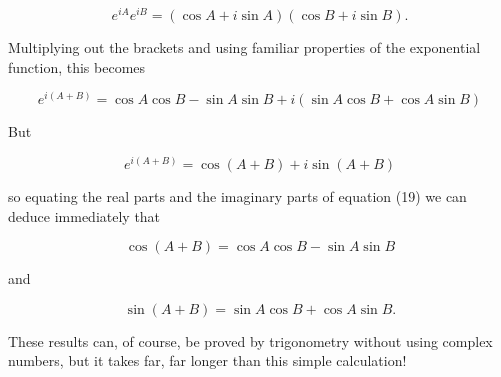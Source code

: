   $$e^{iA} e^{iB} = (\cos A +i \sin A)(\cos B +i \sin B). \tag{18}$$ 

  Multiplying out the brackets and using familiar properties of the exponential 
  function, this becomes 

  $$e^{i(A+B)} = \cos A \cos B -\sin A \sin B +i(\sin A \cos B+\cos A \sin B) 
  \tag{19}$$ 

  But 

  $$e^{i(A+B)} = \cos (A+B) + i \sin (A+B) \tag{20}$$ 

  so equating the real parts and the imaginary parts of equation (19) we can 
  deduce immediately that 

  $$\cos (A+B)= \cos A \cos B -\sin A \sin B \tag{21}$$ 

  and 

  $$\sin (A+B) = \sin A \cos B+\cos A \sin B . \tag{22}$$ 

  These results can, of course, be proved by trigonometry without using complex 
  numbers, but it takes far, far longer than this simple calculation! 